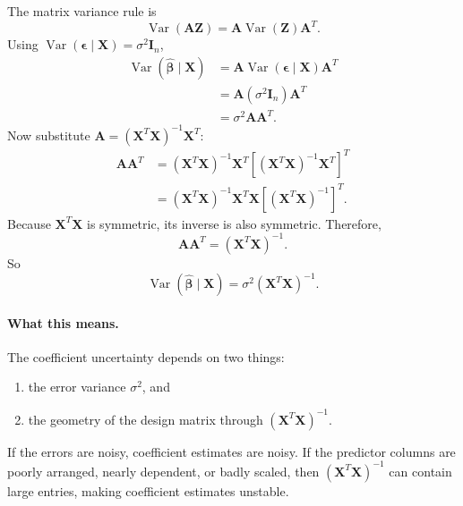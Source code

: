 The matrix variance rule is
\begin{equation}
  \operatorname{Var}(\mathbf{A}\mathbf{Z})
  =\mathbf{A}\operatorname{Var}(\mathbf{Z})\mathbf{A}^T.
\end{equation}
Using \(\operatorname{Var}(\boldsymbol{\epsilon}\mid\mathbf{X})=\sigma^2\mathbf{I}_n\),
\begin{align}
  \operatorname{Var}(\widehat{\boldsymbol{\beta}}\mid\mathbf{X})
  &=\mathbf{A}\operatorname{Var}(\boldsymbol{\epsilon}\mid\mathbf{X})\mathbf{A}^T \\
  &=\mathbf{A}(\sigma^2\mathbf{I}_n)\mathbf{A}^T \\
  &=\sigma^2\mathbf{A}\mathbf{A}^T.
\end{align}
Now substitute \(\mathbf{A}=(\mathbf{X}^T\mathbf{X})^{-1}\mathbf{X}^T\):
\begin{align}
  \mathbf{A}\mathbf{A}^T
  &=(\mathbf{X}^T\mathbf{X})^{-1}\mathbf{X}^T
  \left[(\mathbf{X}^T\mathbf{X})^{-1}\mathbf{X}^T\right]^T \\
  &=(\mathbf{X}^T\mathbf{X})^{-1}\mathbf{X}^T
  \mathbf{X}\left[(\mathbf{X}^T\mathbf{X})^{-1}\right]^T.
\end{align}
Because \(\mathbf{X}^T\mathbf{X}\) is symmetric, its inverse is also symmetric.  Therefore,
\begin{equation}
  \mathbf{A}\mathbf{A}^T=(\mathbf{X}^T\mathbf{X})^{-1}.
\end{equation}
So
\begin{equation}
  \boxed{
  \operatorname{Var}(\widehat{\boldsymbol{\beta}}\mid\mathbf{X})
  =\sigma^2(\mathbf{X}^T\mathbf{X})^{-1}.
  }
  \label{eq:ch10-var-beta-hat}
\end{equation}

\paragraph{What this means.}
The coefficient uncertainty depends on two things:
\begin{enumerate}
  \item the error variance \(\sigma^2\), and
  \item the geometry of the design matrix through \((\mathbf{X}^T\mathbf{X})^{-1}\).
\end{enumerate}
If the errors are noisy, coefficient estimates are noisy.  If the predictor columns are poorly arranged, nearly dependent, or badly scaled, then \((\mathbf{X}^T\mathbf{X})^{-1}\) can contain large entries, making coefficient estimates unstable.

